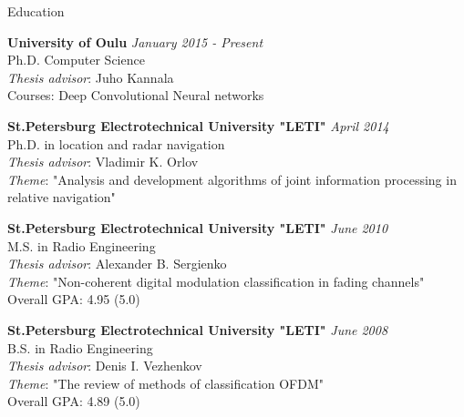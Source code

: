 \documentclass{resume} %
\begin{document}

\begin{rSection}{Education}

{\bf University of Oulu} \hfill {\em January 2015 - Present}  \\ 
Ph.D. Computer Science \\
{\it Thesis advisor}: Juho Kannala \\
Courses: Deep Convolutional Neural networks \smallskip

{\bf St.Petersburg Electrotechnical University "LETI"} \hfill {\em April 2014} \\ 
Ph.D. in location and radar navigation \\
{\it Thesis advisor}: Vladimir K. Orlov \\
{\it Theme}: "Analysis and development algorithms of joint information processing in relative navigation" \smallskip

{\bf St.Petersburg Electrotechnical University "LETI"} \hfill {\em June 2010} \\ 
M.S. in  Radio Engineering \\
{\it Thesis advisor}: Alexander B. Sergienko \\
{\it Theme}: "Non-coherent digital modulation classification in fading channels" \\
Overall GPA: 4.95 (5.0) \smallskip

{\bf St.Petersburg Electrotechnical University "LETI"} \hfill {\em June 2008} \\ 
B.S. in  Radio Engineering \\
{\it Thesis advisor}: Denis I. Vezhenkov \\
{\it Theme}: "The review of methods of classification OFDM" \\
Overall GPA: 4.89 (5.0) \smallskip

\end{rSection}

\end{document}

